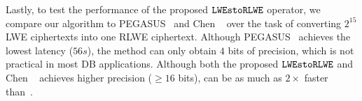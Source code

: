 Lastly, to test the performance of the proposed $\texttt{LWEstoRLWE}$ operator, we
compare our algorithm to PEGASUS~\cite{pegasus} and 
Chen \etal~\cite{conversionhaochen}
over the task of converting $2^{15}$ LWE ciphertexts into
one RLWE ciphertext. Although PEGASUS~\cite{pegasus} achieves 
the lowest latency ($56s$), 
the method can only obtain $4$ bits of precision, which is 
not practical in most DB applications.
Although both the proposed $\texttt{LWEstoRLWE}$ and Chen \etal~\cite{conversionhaochen}
achieves higher precision ($\geq 16$ bits), \NAME
can be as much as $2 \times$ faster than~\cite{conversionhaochen}.



